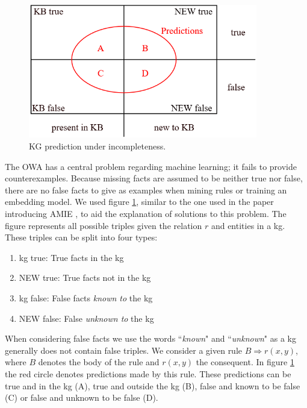 \begin{figure}[htp]
    \centering
    \includegraphics[width=10cm]{figures/kb_venn.png}
    \caption{KG prediction under incompleteness.}
    \label{KB_predictions}
\end{figure}

The OWA has a central problem regarding machine learning; it fails to provide counterexamples. Because missing facts are assumed to be neither true nor false, there are no false facts to give as examples when mining rules or training an embedding model. We used figure \ref{KB_predictions}, similar to the one used in the paper introducing AMIE \cite{amie}, to aid the explanation of solutions to this problem. The figure represents all possible triples given the relation $r$ and entities in a \gls{kg}. These triples can be split into four types:
\begin{enumerate}
    \item \gls{kg} true: True facts in the \gls{kg}
    \item NEW true: True facts not in the \gls{kg}
    \item \gls{kg} false: False facts \textit{known to} the \gls{kg}
    \item NEW false: False \textit{unknown to} the \gls{kg}
\end{enumerate}
When considering false facts we use the words ``\textit{known}" and ``\textit{unknown}" as a \gls{kg} generally does not contain false triples. We consider a given rule $B \Rightarrow r(x, y)$, where $B$ denotes the body of the rule and $r(x, y)$ the consequent. In figure \ref{KB_predictions} the red circle denotes predictions made by this rule. These predictions can be true and in the \gls{kg} (A), true and outside the \gls{kg} (B), false and known to be false (C) or false and unknown to be false (D). 

